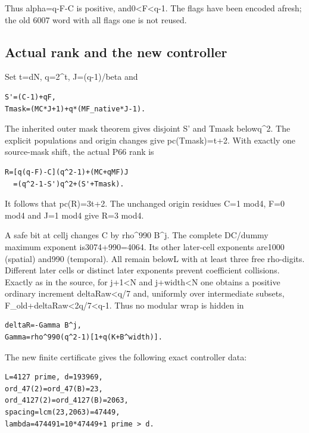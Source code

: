 Thus alpha=q-F-C is positive, and0<F<q-1. The flags have been encoded afresh; the old 6007 word with all flags one is not reused.

\subsection{Actual rank and the new controller}
Set t=dN, q=2\textasciicircum{}t, J=(q-1)/beta and

\begin{Verbatim}[fontsize=\small,breaklines=true,breakanywhere=true,breaksymbolleft={}]
S'=(C-1)+qF,
Tmask=(MC*J+1)+q*(MF_native*J-1).
\end{Verbatim}

The inherited outer mask theorem gives disjoint S' and Tmask belowq\textasciicircum{}2. The explicit populations and origin changes give pc(Tmask)=t+2. With exactly one source-mask shift, the actual P66 rank is

\begin{Verbatim}[fontsize=\small,breaklines=true,breakanywhere=true,breaksymbolleft={}]
R=[q(q-F)-C](q^2-1)+(MC+qMF)J
  =(q^2-1-S')q^2+(S'+Tmask).
\end{Verbatim}

It follows that pc(R)=3t+2. The unchanged origin residues C=1 mod4, F=0 mod4 and J=1 mod4 give R=3 mod4.

A safe bit at cellj changes C by rho\textasciicircum{}990 B\textasciicircum{}j. The complete DC/dummy maximum exponent is3074+990=4064. Its other later-cell exponents are1000 (spatial) and990 (temporal). All remain belowL with at least three free rho-digits. Different later cells or distinct later exponents prevent coefficient collisions. Exactly as in the source, for j+1<N and j+width<N one obtains a positive ordinary increment deltaRaw<q/7 and, uniformly over intermediate subsets, F\_old+deltaRaw<2q/7<q-1. Thus no modular wrap is hidden in

\begin{Verbatim}[fontsize=\small,breaklines=true,breakanywhere=true,breaksymbolleft={}]
deltaR=-Gamma B^j,
Gamma=rho^990(q^2-1)[1+q(K+B^width)].
\end{Verbatim}

The new finite certificate gives the following exact controller data:

\begin{Verbatim}[fontsize=\small,breaklines=true,breakanywhere=true,breaksymbolleft={}]
L=4127 prime, d=193969,
ord_47(2)=ord_47(B)=23,
ord_4127(2)=ord_4127(B)=2063,
spacing=lcm(23,2063)=47449,
lambda=474491=10*47449+1 prime > d.
\end{Verbatim}


